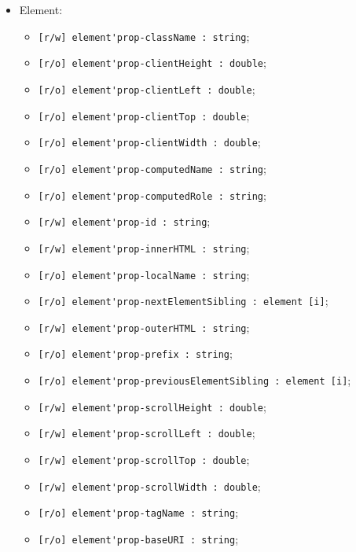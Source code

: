 \documentclass[a4paper, 14pt]{extarticle}
\newenvironment{icItems}
	{ \begin{itemize} [noitemsep,nolistsep] }
	{ \end{itemize} }
\begin{document}
\begin{icItems}
	\item Element:
	\begin{icItems}
		\item \lstinline|[r/w] element'prop-className : string|;
		\item \lstinline|[r/o] element'prop-clientHeight : double|;
		\item \lstinline|[r/o] element'prop-clientLeft : double|;
		\item \lstinline|[r/o] element'prop-clientTop : double|;
		\item \lstinline|[r/o] element'prop-clientWidth : double|;
		\item \lstinline|[r/o] element'prop-computedName : string|;
		\item \lstinline|[r/o] element'prop-computedRole : string|;
		\item \lstinline|[r/w] element'prop-id : string|;
		\item \lstinline|[r/w] element'prop-innerHTML : string|;
		\item \lstinline|[r/o] element'prop-localName : string|;
		\item \lstinline|[r/o] element'prop-nextElementSibling : element [i]|;
		\item \lstinline|[r/w] element'prop-outerHTML : string|;
		\item \lstinline|[r/o] element'prop-prefix : string|;
		\item \lstinline|[r/o] element'prop-previousElementSibling : element [i]|;
		\item \lstinline|[r/w] element'prop-scrollHeight : double|;
		\item \lstinline|[r/w] element'prop-scrollLeft : double|;
		\item \lstinline|[r/w] element'prop-scrollTop : double|;
		\item \lstinline|[r/w] element'prop-scrollWidth : double|;
		\item \lstinline|[r/o] element'prop-tagName : string|;
		\item \lstinline|[r/o] element'prop-baseURI : string|;
	\end{icItems}
	

\end{icItems}
\end{document}
